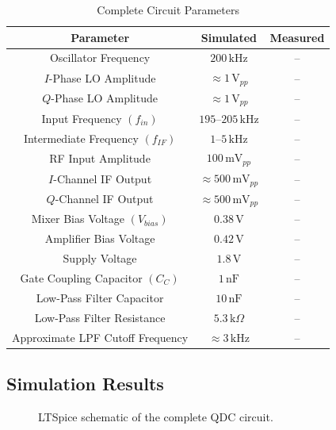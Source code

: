 \documentclass[conference]{IEEEtran}
\begin{document}
\begin{table}[H]
\centering
\caption{Complete Circuit Parameters}
\label{tab:qdc_parameters}
\renewcommand{\arraystretch}{1.2}
\begin{tabular}{|c|c|c|}
\hline
\textbf{Parameter} & \textbf{Simulated} & \textbf{Measured} \\
\hline
Oscillator Frequency & $200\,\text{kHz}$ & -- \\
\hline
$I$-Phase LO Amplitude & $\approx 1\,\text{V}_{pp}$ & -- \\
\hline
$Q$-Phase LO Amplitude & $\approx 1\,\text{V}_{pp}$ & -- \\
\hline
Input Frequency $(f_{in})$ & $195$--$205\,\text{kHz}$ & -- \\
\hline
Intermediate Frequency $(f_{IF})$ & $1$--$5\,\text{kHz}$ & -- \\
\hline
RF Input Amplitude & $100\,\text{mV}_{pp}$ & -- \\
\hline
$I$-Channel IF Output & $\approx 500\,\text{mV}_{pp}$ & -- \\
\hline
$Q$-Channel IF Output & $\approx 500\,\text{mV}_{pp}$ & -- \\
\hline
Mixer Bias Voltage $(V_{bias})$ & $0.38\,\text{V}$ & -- \\
\hline
Amplifier Bias Voltage & $0.42\,\text{V}$ & -- \\
\hline
Supply Voltage & $1.8\,\text{V}$ & -- \\
\hline
Gate Coupling Capacitor $(C_C)$ & $1\,\text{nF}$ & -- \\
\hline
Low-Pass Filter Capacitor & $10\,\text{nF}$ & -- \\
\hline
Low-Pass Filter Resistance & $5.3\,\text{k}\Omega$ & -- \\
\hline
Approximate LPF Cutoff Frequency & $\approx 3\,\text{kHz}$ & -- \\
\hline
\end{tabular}
\end{table}

\subsection{Simulation Results}

\begin{figure}[H]
    \centering
    \caption{LTSpice schematic of the complete QDC circuit.}
    \label{fig:full_schematic}
\end{figure}
\end{document}
